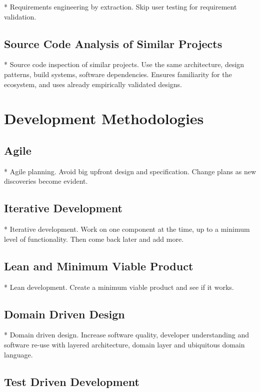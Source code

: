 * Requirements engineering by extraction. Skip user testing for requirement validation. 

\subsection{Source Code Analysis of Similar Projects}
* Source code inspection of similar projects. Use the same architecture, design patterns, build systems, software dependencies. Ensures familiarity for the ecosystem, and uses already empirically validated designs.

\section{Development Methodologies}

\subsection{Agile}

* Agile planning. Avoid big upfront design and specification. Change plans as new discoveries become evident.

\subsection{Iterative Development}
* Iterative development. Work on one component at the time, up to a minimum level of functionality. Then come back later and add more.


\subsection{Lean and Minimum Viable Product}

* Lean development. Create a minimum viable product and see if it works.

\subsection{Domain Driven Design}

* Domain driven design. Increase software quality, developer understanding and software re-use with layered architecture, domain layer and ubiquitous domain language.

\subsection{Test Driven Development}

